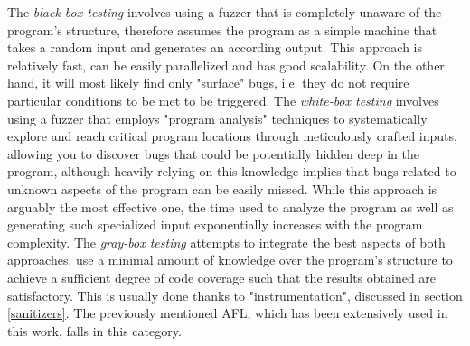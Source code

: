 \documentclass[Lau,oneside]{sapthesis}%
\begin{document}
The \textit{black-box testing} involves using a fuzzer that is completely unaware of the program's structure, therefore assumes the program as a simple machine that takes a random input and generates an according output. This approach is relatively fast, can be easily parallelized and has good scalability. On the other hand, it will most likely find only "surface" bugs, i.e. they do not require particular conditions to be met to be triggered.     
\newline \newline
The \textit{white-box testing} involves using a fuzzer that employs "program analysis" techniques to systematically explore and reach critical program locations through meticulously crafted inputs, allowing you to discover bugs that could be potentially hidden deep in the program, although heavily relying on this knowledge implies that bugs related to unknown aspects of the program can be easily missed. While this approach is arguably the most effective one, the time used to analyze the program as well as generating such specialized input exponentially increases with the program complexity.
\newline \newline
The \textit{gray-box testing} attempts to integrate the best aspects of both approaches: use a minimal amount of knowledge over the program's structure to achieve a sufficient degree of code coverage such that the results obtained are satisfactory. This is usually done thanks to "instrumentation", discussed in section \ref{sanitizers}.
The previously mentioned AFL, which has been extensively used in this work, falls in this category.
\end{document}
